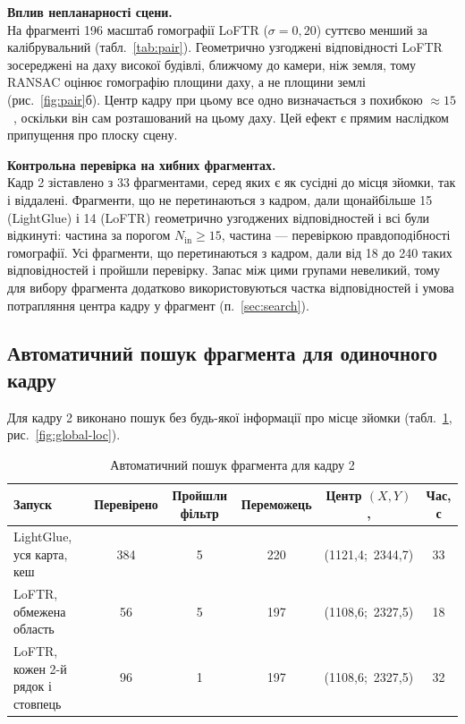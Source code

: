 \textbf{Вплив непланарності сцени.}\\
На фрагменті 196 масштаб гомографії LoFTR ($\sigma = 0{,}20$) суттєво менший за калібрувальний (табл.~\ref{tab:pair}). Геометрично узгоджені відповідності LoFTR зосереджені на даху високої будівлі, ближчому до камери, ніж земля, тому RANSAC оцінює гомографію площини даху, а не площини землі (рис.~\ref{fig:pair}б). Центр кадру при цьому все одно визначається з похибкою $\approx 15$~\px{}, оскільки він сам розташований на цьому даху. Цей ефект є прямим наслідком припущення про плоску сцену.

\textbf{Контрольна перевірка на хибних фрагментах.}\\
Кадр 2 зіставлено з 33 фрагментами, серед яких є як сусідні до місця зйомки, так і віддалені. Фрагменти, що не перетинаються з кадром, дали щонайбільше 15 (LightGlue) і 14 (LoFTR) геометрично узгоджених відповідностей і всі були відкинуті: частина за порогом $N_{\text{in}} \ge 15$, частина --- перевіркою правдоподібності гомографії. Усі фрагменти, що перетинаються з кадром, дали від 18 до 240 таких відповідностей і пройшли перевірку. Запас між цими групами невеликий, тому для вибору фрагмента додатково використовуються частка відповідностей і умова потрапляння центра кадру у фрагмент (п.~\ref{sec:search}).

\subsection{Автоматичний пошук фрагмента для одиночного кадру}

Для кадру 2 виконано пошук без будь-якої інформації про місце зйомки (табл.~\ref{tab:search}, рис.~\ref{fig:global-loc}).

\begin{table}[H]
\centering
\caption{Автоматичний пошук фрагмента для кадру 2}
\label{tab:search}
\small
\begin{tabular}{lccccc}
\toprule
\textbf{Запуск} & \textbf{Перевірено} & \textbf{Пройшли фільтр} & \textbf{Переможець} & \textbf{Центр $(X, Y)$, \px{}} & \textbf{Час, с} \\
\midrule
LightGlue, уся карта, кеш & 384 & 5 & 220 & (1121,4;\ 2344,7) & 33 \\
LoFTR, обмежена область & 56 & 5 & 197 & (1108,6;\ 2327,5) & 18 \\
LoFTR, кожен 2-й рядок і стовпець & 96 & 1 & 197 & (1108,6;\ 2327,5) & 32 \\
\bottomrule
\end{tabular}
\end{table}

